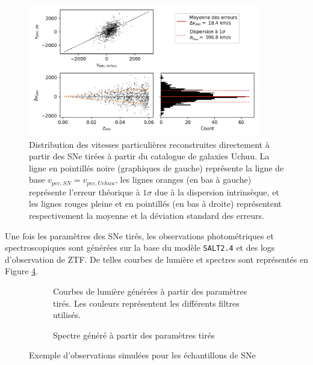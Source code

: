 \documentclass{book}
\def\saltd{\texttt{SALT2.4}\xspace}
\begin{document}
\begin{figure}
	\centering
	\includegraphics[width=0.9\textwidth]{figures/vp_draw.png}
	\caption{Distribution des vitesses particulières reconstruites directement à partir des SNe tirées à partir du catalogue de galaxies Uchuu. La ligne en pointillés noire (graphiques de gauche) représente la ligne de base $v_{pec, SN} = v_{pec, Uchuu}$, les lignes oranges (en bas à gauche) représente l'erreur théorique à $1\sigma$ due à la dispersion intrinsèque, et les lignes rouges pleine et en pointillés (en bas à droite) représentent respectivement la moyenne et la déviation standard des erreurs.}
	\label{fig:vp_draw}
\end{figure}

Une fois les paramètres des SNe tirés, les observations photométriques et spectroscopiques sont générées sur la base du modèle \saltd et des logs d'observation de ZTF. De telles courbes de lumière et spectres sont représentés en Figure \ref{fig:obs}.

\begin{figure}
	\centering
	\begin{subfigure}[c]{0.45\textwidth}
		\caption{Courbes de lumière générées à partir des paramètres tirés. Les couleurs représentent les différents filtres utilisés.}
		\label{fig:lc}
	\end{subfigure}
	\hfill
	\begin{subfigure}[c]{0.5\textwidth}
		\centering
		\caption{Spectre généré à partir des paramètres tirés}
		\label{fig:spectra}
	\end{subfigure}
	\label{fig:obs}
	\caption{Exemple d'observations simulées pour les échantillons de SNe}
\end{figure}
\end{document}
